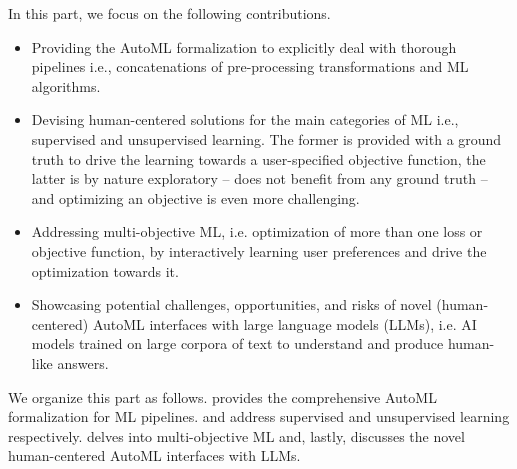 \documentclass[a4paper,12pt,times,numbered,print,index]{Classes/PhDThesisPSnPDF}
\begin{document}
In this part, we focus on the following contributions.
\begin{itemize}
    \item Providing the AutoML formalization to explicitly deal with thorough pipelines i.e., concatenations of pre-processing transformations and ML algorithms.
    \item Devising human-centered solutions for the main categories of ML i.e., supervised and unsupervised learning. The former is provided with a ground truth to drive the learning towards a user-specified objective function, the latter is by nature exploratory -- does not benefit from any ground truth -- and optimizing an objective is even more challenging.
    \item Addressing multi-objective ML, i.e. optimization of more than one loss or objective function, by interactively learning user preferences and drive the optimization towards it.
    \item Showcasing potential challenges, opportunities, and risks of novel (human-centered) AutoML interfaces with large language models (LLMs), i.e. AI models trained on large corpora of text to understand and produce human-like answers.
\end{itemize}

We organize this part as follows.
 provides the comprehensive AutoML formalization for ML pipelines.
 and  address supervised and unsupervised learning respectively.
 delves into multi-objective ML and, lastly,  discusses the novel human-centered AutoML interfaces with LLMs.
\end{document}
